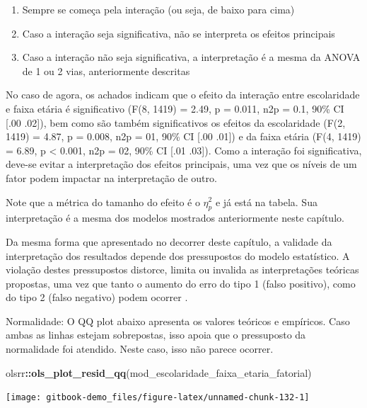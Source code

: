 \documentclass[
]{book}
\newenvironment{Shaded}{\begin{snugshade}}{\end{snugshade}}
\newcommand{\KeywordTok}[1]{\textcolor[rgb]{0.13,0.29,0.53}{\textbf{#1}}}
\newcommand{\NormalTok}[1]{#1}
\newcommand{\OperatorTok}[1]{\textcolor[rgb]{0.81,0.36,0.00}{\textbf{#1}}}
\providecommand{\tightlist}{%
  \setlength{\itemsep}{0pt}\setlength{\parskip}{0pt}}
\begin{document}
\begin{enumerate}
\def\labelenumi{\arabic{enumi}.}
\tightlist
\item
  Sempre se começa pela interação (ou seja, de baixo para cima)\\
\item
  Caso a interação seja significativa, não se interpreta os efeitos principais\\
\item
  Caso a interação não seja significativa, a interpretação é a mesma da ANOVA de 1 ou 2 vias, anteriormente descritas
\end{enumerate}

No caso de agora, os achados indicam que o efeito da interação entre escolaridade e faixa etária é significativo (F(8, 1419) = 2.49, p = 0.011, n2p = 0.1, 90\% CI {[}.00 .02{]}), bem como são também significativos os efeitos da escolaridade (F(2, 1419) = 4.87, p = 0.008, n2p = 01, 90\% CI {[}.00 .01{]}) e da faixa etária (F(4, 1419) = 6.89, p \textless{} 0.001, n2p = 02, 90\% CI {[}.01 .03{]}). Como a interação foi significativa, deve-se evitar a interpretação dos efeitos principais, uma vez que os níveis de um fator podem impactar na interpretação de outro.

Note que a métrica do tamanho do efeito é o \(\eta_p^2\) e já está na tabela. Sua interpretação é a mesma dos modelos mostrados anteriormente neste capítulo.

Da mesma forma que apresentado no decorrer deste capítulo, a validade da interpretação dos resultados depende dos pressupostos do modelo estatístico. A violação destes pressupostos distorce, limita ou invalida as interpretações teóricas propostas, uma vez que tanto o aumento do erro do tipo 1 (falso positivo), como do tipo 2 (falso negativo) podem ocorrer \citep{Lix1996, Barker2015, Ernst2017}.

Normalidade: O QQ plot abaixo apresenta os valores teóricos e empíricos. Caso ambas as linhas estejam sobrepostas, isso apoia que o pressuposto da normalidade foi atendido. Neste caso, isso não parece ocorrer.

\begin{Shaded}
\begin{Highlighting}[]
\NormalTok{olsrr}\OperatorTok{::}\KeywordTok{ols_plot_resid_qq}\NormalTok{(mod_escolaridade_faixa_etaria_fatorial)}
\end{Highlighting}
\end{Shaded}

\begin{center}\texttt{[image: gitbook-demo\_files/figure-latex/unnamed-chunk-132-1]} \end{center}
\end{document}
